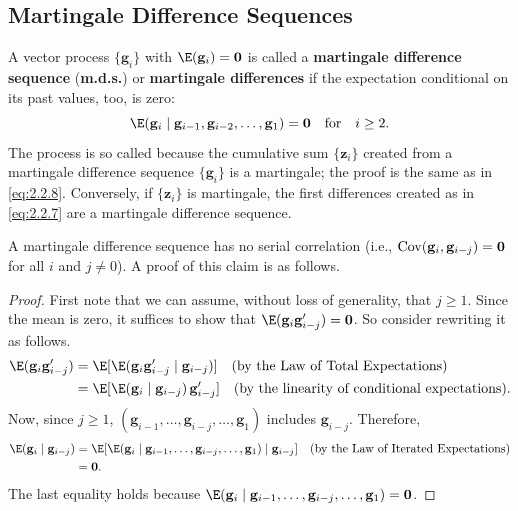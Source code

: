 \subsection*{Martingale Difference Sequences}

A vector process $\{\mathbf{g}_i\}$ with $\E(\mathbf{g}_i) = \mathbf{0}$ is called a
\textbf{martingale difference sequence} (\textbf{m.d.s.}) or \textbf{martingale
differences} if the expectation conditional on its past values, too, is zero:
\begin{equation}
  \E(\mathbf{g}_i \mid \mathbf{g}_{i-1}, \mathbf{g}_{i-2}, \ldots, \mathbf{g}_1)
  = \mathbf{0} \quad \text{for} \quad i \geq 2.
  \label{eq:2.2.9}
\end{equation}
The process is so called because the cumulative sum $\{\mathbf{z}_i\}$ created from
a martingale difference sequence $\{\mathbf{g}_i\}$ is a martingale; the proof is the
same as in \eqref{eq:2.2.8}.  Conversely, if $\{\mathbf{z}_i\}$ is martingale, the
first differences created as in \eqref{eq:2.2.7} are a martingale difference sequence.

A martingale difference sequence has no serial correlation (i.e.,
$\operatorname{Cov}(\mathbf{g}_i, \mathbf{g}_{i-j}) = \mathbf{0}$ for all $i$ and $j \neq 0$).
A proof of this claim is as follows.

\begin{proof}
First note that we can assume, without loss of generality, that $j \geq 1$.  Since
the mean is zero, it suffices to show that
$\E(\mathbf{g}_i\mathbf{g}_{i-j}') = \mathbf{0}$.  So consider rewriting it as
follows.
\begin{align*}
  \E(\mathbf{g}_i\mathbf{g}_{i-j}')
  &= \E[\E(\mathbf{g}_i\mathbf{g}_{i-j}' \mid \mathbf{g}_{i-j})]
     \quad \text{(by the Law of Total Expectations)} \\
  &= \E[\E(\mathbf{g}_i \mid \mathbf{g}_{i-j})\,\mathbf{g}_{i-j}']
     \quad \text{(by the linearity of conditional expectations)}.
\end{align*}
Now, since $j \geq 1$, $(\mathbf{g}_{i-1}, \ldots, \mathbf{g}_{i-j}, \ldots,
\mathbf{g}_1)$ includes $\mathbf{g}_{i-j}$.  Therefore,
\begin{align*}
  \E(\mathbf{g}_i \mid \mathbf{g}_{i-j})
  &= \E[\E(\mathbf{g}_i \mid \mathbf{g}_{i-1}, \ldots, \mathbf{g}_{i-j}, \ldots,
     \mathbf{g}_1) \mid \mathbf{g}_{i-j}]
     \quad \text{(by the Law of Iterated Expectations)} \\
  &= \mathbf{0}.
\end{align*}
The last equality holds because
$\E(\mathbf{g}_i \mid \mathbf{g}_{i-1}, \ldots, \mathbf{g}_{i-j}, \ldots,
\mathbf{g}_1) = \mathbf{0}$.
\end{proof}

